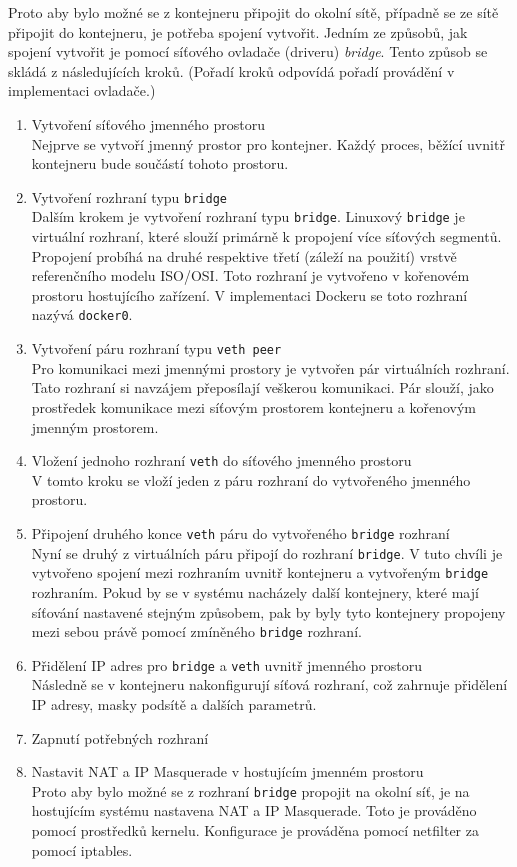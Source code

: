 Proto aby bylo možné se z kontejneru připojit do okolní sítě, případně se ze sítě připojit do kontejneru, je potřeba spojení vytvořit. Jedním ze způsobů, jak spojení vytvořit je pomocí síťového ovladače (driveru) \textit{bridge}. Tento způsob se skládá z následujících kroků. (Pořadí kroků odpovídá pořadí provádění v implementaci ovladače.)
\begin{enumerate}
\item Vytvoření síťového jmenného prostoru\\
Nejprve se vytvoří jmenný prostor pro kontejner. Každý proces, běžící uvnitř kontejneru bude součástí tohoto prostoru.%
\item Vytvoření rozhraní typu \verb|bridge| \\
Dalším krokem je vytvoření rozhraní typu \verb|bridge|. Linuxový \verb|bridge| je virtuální rozhraní, které slouží primárně k propojení více síťových segmentů. Propojení probíhá na druhé respektive třetí (záleží na použití) vrstvě referenčního modelu ISO/OSI. Toto rozhraní je vytvořeno v kořenovém prostoru hostujícího zařízení. V implementaci Dockeru se toto rozhraní nazývá \verb|docker0|.
\item Vytvoření páru rozhraní typu \verb|veth peer|\\
Pro komunikaci mezi jmennými prostory je vytvořen pár virtuálních rozhraní. Tato rozhraní si navzájem přeposílají veškerou komunikaci. Pár slouží, jako prostředek komunikace mezi síťovým prostorem kontejneru a kořenovým jmenným prostorem.
\item Vložení jednoho rozhraní \verb|veth| do síťového jmenného prostoru\\
V tomto kroku se vloží jeden z páru rozhraní do vytvořeného jmenného prostoru. 
\item Připojení druhého konce \verb|veth| páru do vytvořeného \verb|bridge| rozhraní\\
Nyní se druhý z virtuálních páru připojí do rozhraní \verb|bridge|. V tuto chvíli je vytvořeno spojení mezi rozhraním uvnitř kontejneru a vytvořeným \verb|bridge| rozhraním. Pokud by se v systému nacházely další kontejnery, které mají síťování nastavené stejným způsobem, pak by byly tyto kontejnery propojeny mezi sebou právě pomocí zmíněného \verb|bridge| rozhraní.
\item Přidělení IP adres pro \verb|bridge| a \verb|veth| uvnitř jmenného prostoru\\
Následně se v kontejneru nakonfigurují síťová rozhraní, což zahrnuje přidělení IP adresy, masky podsítě a dalších parametrů.  
\item Zapnutí potřebných rozhraní
\item Nastavit NAT a IP Masquerade v hostujícím jmenném prostoru\\
Proto aby bylo možné se z rozhraní \verb|bridge| propojit na okolní síť, je na hostujícím systému nastavena NAT a IP Masquerade. Toto je prováděno pomocí prostředků kernelu. Konfigurace je prováděna pomocí netfilter za pomocí iptables. 
\end{enumerate}

